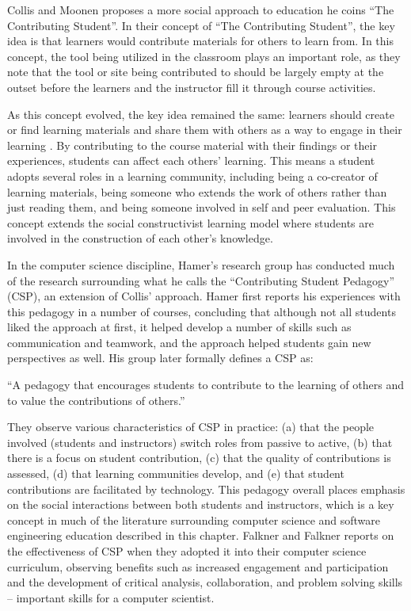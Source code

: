 Collis and Moonen \cite{collis2001flexible} proposes a more social approach to education he coins ``The Contributing Student''. In their concept of ``The Contributing Student'', the key idea is that learners would contribute materials for others to learn from. In this concept, the tool being utilized in the classroom plays an important role, as they note that the tool or site being contributed to should be largely empty at the outset before the learners and the instructor fill it through course activities.

As this concept evolved, the key idea remained the same: learners should create or find learning materials and share them with others as a way to engage in their learning \cite{collis2006contributing}. By contributing to the course material with their findings or their experiences, students can affect each others' learning. This means a student adopts several roles in a learning community, including being a co-creator of learning materials, being someone who extends the work of others rather than just reading them, and being someone involved in self and peer evaluation. This concept extends the social constructivist learning model where students are involved in the construction of each other’s knowledge.

In the computer science discipline, Hamer’s research group has conducted much of the research surrounding what he calls the ``Contributing Student Pedagogy'' (CSP), an extension of Collis’ approach. Hamer first reports his experiences \cite{hamer2006some} with this pedagogy in a number of courses, concluding that although not all students liked the approach at first, it helped develop a number of skills such as communication and teamwork, and the approach helped students gain new perspectives as well. His group later formally defines a CSP \cite{hamer2008contributing} as:

``A pedagogy that encourages students to contribute to the learning of others and to value the contributions of others.''

They observe various characteristics of CSP in practice: (a) that the people involved (students and instructors) switch roles from passive to active, (b) that there is a focus on student contribution, (c) that the quality of contributions is assessed, (d) that learning communities develop, and (e) that student contributions are facilitated by technology. This pedagogy overall places emphasis on the social interactions between both students and instructors, which is a key concept in much of the literature surrounding computer science and software engineering education described in this chapter. Falkner and Falkner \cite{falkner2012supporting} reports on the effectiveness of CSP when they adopted it into their computer science curriculum, observing benefits such as increased engagement and participation and the development of critical analysis, collaboration, and problem solving skills – important skills for a computer scientist.

